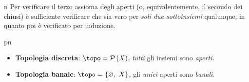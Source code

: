 \begin{remark}{n}
	Per verificare il terzo assioma degli aperti (o, equivalentemente, il secondo dei chiusi) è sufficiente verificare che sia vero per \textit{soli due sottoinsiemi} qualunque, in quanto poi è verificato per induzione.
\end{remark}

\begin{example}{pn}~{}
	\begin{itemize}
		\item \textbf{Topologia discreta}: $\topo=\powerset{X}$, \textit{tutti} gli insiemi sono \textit{aperti}.
		\item \textbf{Topologia banale}: $\topo=\{\emptyset,\ X\}$, gli \textit{unici} aperti sono \textit{banali}.
	\end{itemize}
\end{example}
